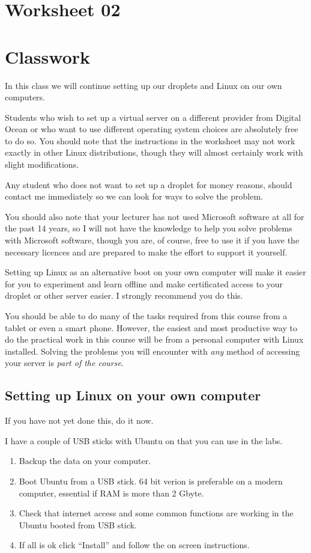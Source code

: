 \documentclass[12pt, a4paper]{article}
\begin{document}
\section*{Worksheet 02}

\section*{Classwork}
In this class we will continue setting up our droplets and Linux on our own 
computers.

Students who wish to set up a virtual server on a different provider from 
Digital Ocean or who want to use different operating system choices are 
absolutely free to do so. You should note that the instructions in the worksheet may not work exactly in other Linux distributions, though they will almost certainly work with slight modifications.

Any student who does not want to set up a droplet for money reasons, should contact me immediately so we can look for ways to solve the problem. 

You should also note that your lecturer has not used Microsoft software at all for the past 14 years, so I will not have the knowledge to help you solve problems with Microsoft software, though you are, of course, free to use it if you have the necessary licences and are prepared to make the effort to support it yourself. 

Setting up Linux as an alternative boot on your own computer will make it easier for you to experiment and learn offline and make certificated access to your droplet or other server easier. I strongly recommend you do this.

You should be able to do many of the tasks required from this course from a tablet or even a smart phone. However, the easiest and most productive way to do the practical work in this course will be from a personal computer with Linux installed. Solving the problems you will encounter with \emph{any} method of accessing your server is \emph{part of the course}.

\subsection*{Setting up Linux on your own computer}

If you have not yet done this, do it now. 

I have a couple of USB sticks with Ubuntu on that you can use in the labs.


\begin{enumerate}
 \item Backup the data on your computer.
 \item Boot Ubuntu from a USB stick. 64 bit verion is preferable on a modern computer, 
  essential if RAM is more than 2 Gbyte.
 \item Check that internet access and some common functions are working in the Ubuntu booted from USB stick.
 \item If all is ok click ``Install'' and follow the on screen instructions.
\end{enumerate}
\end{document}
